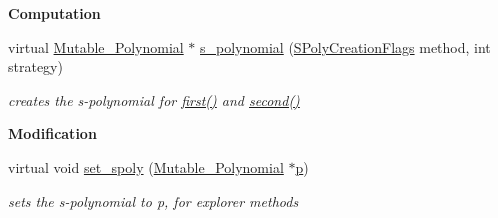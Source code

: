 \begin{Indent}\textbf{ Computation}\par
\begin{DoxyCompactItemize}
\item 
\mbox{\label{class_critical___pair___basic_a1bcad730e0bfcf9c833b5fcf0ded468e}} 
virtual \hyperlink{class_mutable___polynomial}{Mutable\+\_\+\+Polynomial} $\ast$ \hyperlink{class_critical___pair___basic_a1bcad730e0bfcf9c833b5fcf0ded468e}{s\+\_\+polynomial} (\hyperlink{group___g_b_computation_ga73257b8a2d5cc826853a71b77d0cebf2}{S\+Poly\+Creation\+Flags} method, int strategy)
\begin{DoxyCompactList}\small\item\em creates the s-\/polynomial for \hyperlink{class_critical___pair___basic_a6e251e3724fde2c610d921f93889eb67}{first()} and \hyperlink{class_critical___pair___basic_a06da1cbbe1451962b68f2bbf90855fae}{second()} \end{DoxyCompactList}\end{DoxyCompactItemize}
\end{Indent}
\begin{Indent}\textbf{ Modification}\par
\begin{DoxyCompactItemize}
\item 
\mbox{\label{class_critical___pair___basic_ad3ba8ead12784e3133eedf75e7601326}} 
virtual void \hyperlink{class_critical___pair___basic_ad3ba8ead12784e3133eedf75e7601326}{set\+\_\+spoly} (\hyperlink{class_mutable___polynomial}{Mutable\+\_\+\+Polynomial} $\ast$\hyperlink{class_critical___pair___basic_ac80ca2c599a7c234e01e5377292d9a5a}{p})
\begin{DoxyCompactList}\small\item\em sets the s-\/polynomial to {\ttfamily p}, for explorer methods \end{DoxyCompactList}\end{DoxyCompactItemize}
\end{Indent}
